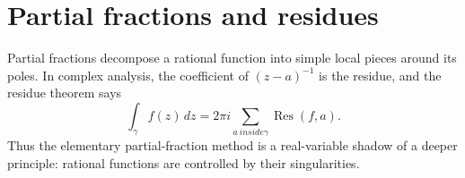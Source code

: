 \section{Partial fractions and residues}

Partial fractions decompose a rational function into simple local pieces around its poles.  In complex analysis, the coefficient of $(z-a)^{-1}$ is the residue, and the residue theorem says
\[
  \int_\gamma f(z)\,dz=2\pi i\sum_{a\ inside \gamma}\operatorname{Res}(f,a).
\]
Thus the elementary partial-fraction method is a real-variable shadow of a deeper principle: rational functions are controlled by their singularities.
